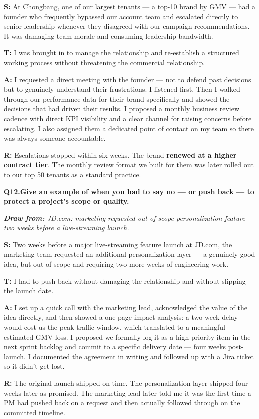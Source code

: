 \documentclass[10pt, letterpaper]{article}
\newcommand{\q}[2]{%
    \smallskip
    \noindent\textbf{\small Q#1.}\quad\textbf{#2}
    \vspace{3pt}
}
\newcommand{\hint}[1]{%
    \begin{notebox}
    \footnotesize\textit{\textbf{Draw from:} #1}
    \end{notebox}
}
\newcommand{\s}[1]{\textbf{\textcolor{starlabel}{S:}} #1}
\newcommand{\ta}[1]{\textbf{\textcolor{starlabel}{T:}} #1}
\newcommand{\ac}[1]{\textbf{\textcolor{starlabel}{A:}} #1}
\newcommand{\res}[1]{\textbf{\textcolor{starlabel}{R:}} #1}
\begin{document}
\begin{answerbox}
\footnotesize
\s{At Chongbang, one of our largest tenants --- a top-10 brand by GMV --- had a founder who frequently bypassed our account team and escalated directly to senior leadership whenever they disagreed with our campaign recommendations. It was damaging team morale and consuming leadership bandwidth.}

\medskip
\ta{I was brought in to manage the relationship and re-establish a structured working process without threatening the commercial relationship.}

\medskip
\ac{I requested a direct meeting with the founder --- not to defend past decisions but to genuinely understand their frustrations. I listened first. Then I walked through our performance data for their brand specifically and showed the decisions that had driven their results. I proposed a monthly business review cadence with direct KPI visibility and a clear channel for raising concerns before escalating. I also assigned them a dedicated point of contact on my team so there was always someone accountable.}

\medskip
\res{Escalations stopped within six weeks. The brand \textbf{renewed at a higher contract tier}. The monthly review format we built for them was later rolled out to our top 50 tenants as a standard practice.}
\end{answerbox}

\q{12}{Give an example of when you had to say no --- or push back --- to protect a project's scope or quality.}
\hint{JD.com: marketing requested out-of-scope personalization feature two weeks before a live-streaming launch.}

\begin{answerbox}
\footnotesize
\s{Two weeks before a major live-streaming feature launch at JD.com, the marketing team requested an additional personalization layer --- a genuinely good idea, but out of scope and requiring two more weeks of engineering work.}

\medskip
\ta{I had to push back without damaging the relationship and without slipping the launch date.}

\medskip
\ac{I set up a quick call with the marketing lead, acknowledged the value of the idea directly, and then showed a one-page impact analysis: a two-week delay would cost us the peak traffic window, which translated to a meaningful estimated GMV loss. I proposed we formally log it as a high-priority item in the next sprint backlog and commit to a specific delivery date --- four weeks post-launch. I documented the agreement in writing and followed up with a Jira ticket so it didn't get lost.}

\medskip
\res{The original launch shipped on time. The personalization layer shipped four weeks later as promised. The marketing lead later told me it was the first time a PM had pushed back on a request and then actually followed through on the committed timeline.}
\end{answerbox}
\end{document}
